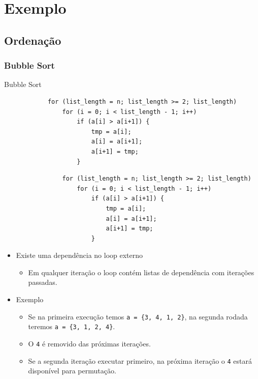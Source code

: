 
\section{Exemplo}
	\subsection{Ordenação}
		\subsubsection{Bubble Sort}
	\begin{frame}[fragile]{Bubble Sort}
		\begin{verbatim}
			for (list_length = n; list_length >= 2; list_length) 
				for (i = 0; i < list_length - 1; i++)
					if (a[i] > a[i+1]) { 
						tmp = a[i];
						a[i] = a[i+1];
						a[i+1] = tmp;
					}
		\end{verbatim}
			\begin{verbatim}
				for (list_length = n; list_length >= 2; list_length) 
					for (i = 0; i < list_length - 1; i++)
						if (a[i] > a[i+1]) { 
							tmp = a[i];
							a[i] = a[i+1];
							a[i+1] = tmp;
						}
			\end{verbatim}
			\begin{itemize}
				\item Existe uma dependência no loop externo
				\begin{itemize}
					\item Em qualquer iteração o loop contém listas de dependência com iterações passadas.
				\end{itemize}
				\item Exemplo
				\begin{itemize}
					\item Se na primeira execução temos {\tt a = \{3, 4, 1, 2\}}, na segunda rodada teremos {\tt a = \{3, 1, 2, 4\}}.
					\item O \texttt{4} é removido das próximas iterações.
							\medskip
					\item Se a segunda iteração executar primeiro, na próxima iteração o \texttt{4} estará disponível para permutação.
				\end{itemize}
			\end{itemize}
\end{frame}


